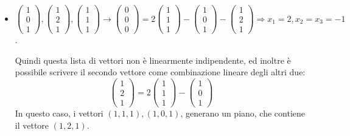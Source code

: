 \documentclass[a4paper,12pt]{article}
\begin{document}
\begin{itemize}
		\item $\begin{pmatrix}
			1 \\
			0 \\
			1
		\end{pmatrix},
		\begin{pmatrix}
			1 \\
			2 \\
			1
		\end{pmatrix},
		\begin{pmatrix}
			1 \\
			1 \\
			1
		\end{pmatrix} \rightarrow 
		\begin{pmatrix}
			0 \\
			0 \\
			0
		\end{pmatrix} = 
		2\begin{pmatrix}
			1 \\
			1 \\
			1 
		\end{pmatrix} - 
		\begin{pmatrix}
			1 \\
			0 \\
			1
		\end{pmatrix} - 
		\begin{pmatrix}
			1 \\
			2 \\
			1
		\end{pmatrix} \Rightarrow x_1 = 2, x_2 = x_3 = -1$.
		
		Quindi questa lista di vettori non è linearmente indipendente, ed inoltre è possibile scrivere il secondo vettore come combinazione lineare degli altri due:
		\[
		\begin{pmatrix}
		1 \\
		2 \\
		1
		\end{pmatrix} = 2\begin{pmatrix}
		1 \\
		1 \\
		1
		\end{pmatrix} -
		\begin{pmatrix}
		1 \\
		0 \\
		1
		\end{pmatrix}\]
		In questo caso, i vettori $(1,1,1), (1,0,1)$, generano un piano, che contiene il vettore $(1,2,1)$.
	\end{itemize}
	
\end{document}
